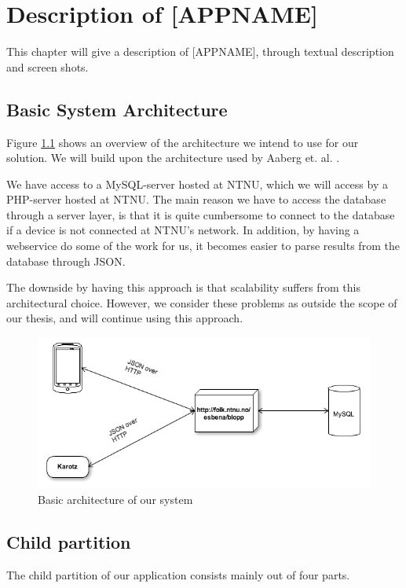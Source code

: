 \chapter{Description of [APPNAME]}
\label{chp:description}

This chapter will give a description of [APPNAME], through textual description and screen shots.

\section{Basic System Architecture}
Figure \ref{fig:basic-architecture} shows an overview of the architecture we intend to use for our solution. We will build upon the architecture used by Aaberg et. al. \cite{CustomerDriven}.

We have access to a MySQL-server hosted at NTNU, which we will access by a PHP-server hosted at NTNU. The main reason we have to access the database through a server layer, is that it is quite cumbersome to connect to the database if a device is not connected at NTNU's network. In addition, by having a webservice do some of the work for us, it becomes easier to parse results from the database through JSON.   


The downside by having this approach is that scalability suffers from this architectural choice. However, we consider these problems as outside the scope of our thesis, and will continue using this approach.

\begin{figure}
		\centering
			\includegraphics[width=0.50\paperwidth]{Pictures/basic-architecture.png}
		\caption{Basic architecture of our system}
		\label{fig:basic-architecture}
\end{figure}


\section{Child partition}
The child partition of our application consists mainly out of four parts. 

